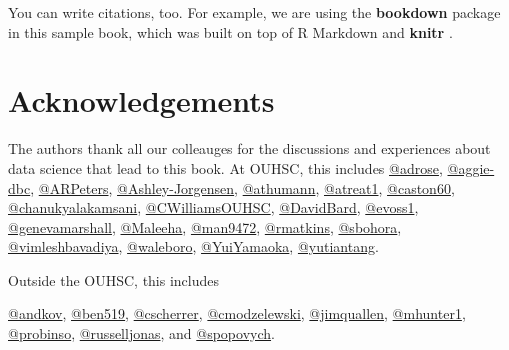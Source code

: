 \documentclass[
]{book}
\begin{document}
You can write citations, too. For example, we are using the \textbf{bookdown} package \citep{R-bookdown} in this sample book, which was built on top of R Markdown and \textbf{knitr} \citep{xie2015}.

\hypertarget{acknowledgements}{%
\chapter{Acknowledgements}\label{acknowledgements}}

The authors thank all our colleauges for the discussions and experiences about data science that lead to this book. At OUHSC, this includes
\href{https://github.com/adrose}{@adrose},
\href{https://github.com/aggie-dbc}{@aggie-dbc},
\href{https://github.com/ARPeters}{@ARPeters},
\href{https://github.com/Ashley-Jorgensen}{@Ashley-Jorgensen},
\href{https://github.com/athumann}{@athumann},
\href{https://github.com/atreat1}{@atreat1},
\href{https://github.com/caston60}{@caston60},
\href{https://github.com/chanukyalakamsani}{@chanukyalakamsani},
\href{https://github.com/CWilliamsOUHSC}{@CWilliamsOUHSC},
\href{https://github.com/DavidBard}{@DavidBard},
\href{https://github.com/evoss1}{@evoss1},
\href{https://github.com/genevamarshall}{@genevamarshall},
\href{https://github.com/Maleeha}{@Maleeha},
\href{https://github.com/man9472}{@man9472},
\href{https://github.com/rmatkins}{@rmatkins},
\href{https://github.com/sbohora}{@sbohora},
\href{https://github.com/vimleshbavadiya}{@vimleshbavadiya},
\href{https://github.com/waleboro}{@waleboro},
\href{https://github.com/YuiYamaoka}{@YuiYamaoka},
\href{https://github.com/yutiantang}{@yutiantang}.

Outside the OUHSC, this includes

\href{https://github.com/andkov}{@andkov},
\href{https://github.com/ben519}{@ben519},
\href{https://github.com/cscherrer}{@cscherrer},
\href{https://github.com/cmodzelewski}{@cmodzelewski},
\href{https://github.com/jimquallen}{@jimquallen},
\href{https://github.com/mhunter1}{@mhunter1},
\href{https://github.com/probinso}{@probinso},
\href{https://github.com/russelljonas}{@russelljonas}, and
\href{https://github.com/spopovych}{@spopovych}.

\backmatter
  
\end{document}
